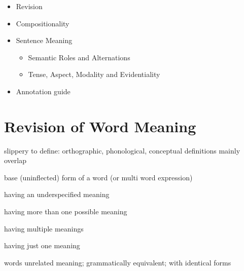 \documentclass[a4paper,landscape,headrule,footrule,xetex]{foils}
\begin{document}
\maketitle

%



\begin{itemize}
\item Revision
\item Compositionality
\item Sentence Meaning
  \begin{itemize}
  \item Semantic Roles and Alternations
  \item Tense, Aspect, Modality and Evidentiality
  \end{itemize}
\item Annotation guide
\end{itemize}

\section{Revision of Word Meaning}


\begin{description}
\item {} slippery to define: orthographic, phonological, conceptual definitions mainly overlap
\item {} base (uninflected) form of a word (or multi word expression)
\item {} having an underspecified meaning
\item {} having more than one possible meaning
 \item {}
   
   \begin{description}
   \item {} having multiple meanings
   \item {} having just one meaning
   \item {} words unrelated meaning; grammatically equivalent;
     with identical forms
\end{description} 
\end{description}
\end{document}
